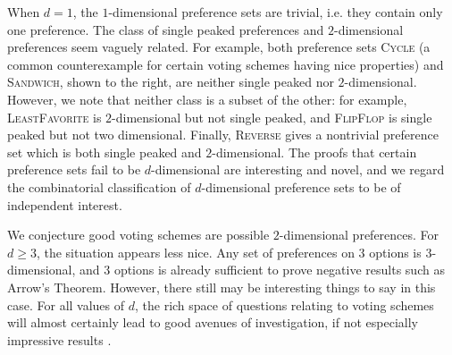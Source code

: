 \documentclass[12pt]{article}
\newcommand{\1}[1]{\mathds{1}[{#1}]}
\begin{document}
  When $d=1$, the $1$-dimensional preference sets are trivial,
  i.e. they contain only one preference.
  The class of single peaked preferences and $2$-dimensional preferences
  seem vaguely related.
  For example, both preference sets \textsc{Cycle} (a common counterexample
  for certain voting schemes having nice properties) and \textsc{Sandwich},
  shown to the right, are neither single peaked nor $2$-dimensional.
  However, we note that neither class is a subset of the other:
  for example, \textsc{LeastFavorite} is $2$-dimensional but not single peaked,
  and \textsc{FlipFlop} is single peaked but not two dimensional.
  Finally, \textsc{Reverse} gives a nontrivial preference set which
  is both single peaked and $2$-dimensional.
  The proofs that certain preference sets fail to be $d$-dimensional
  are interesting and novel, and we regard the combinatorial classification
  of $d$-dimensional preference sets to be of independent interest.

  We conjecture good voting schemes are possible $2$-dimensional preferences.
  For $d\ge 3$, the situation appears less nice.
  Any set of preferences on $3$ options is $3$-dimensional,
  and $3$ options is already sufficient to prove negative
  results such as Arrow's Theorem.
  However, there still may be interesting things to say in this case.
  For all values of $d$, the rich space of questions relating to
  voting schemes will almost certainly lead to good avenues of investigation,
  if not especially impressive results \cite{MattConversation}.

  \clearpage
  {}
  
\end{document}
